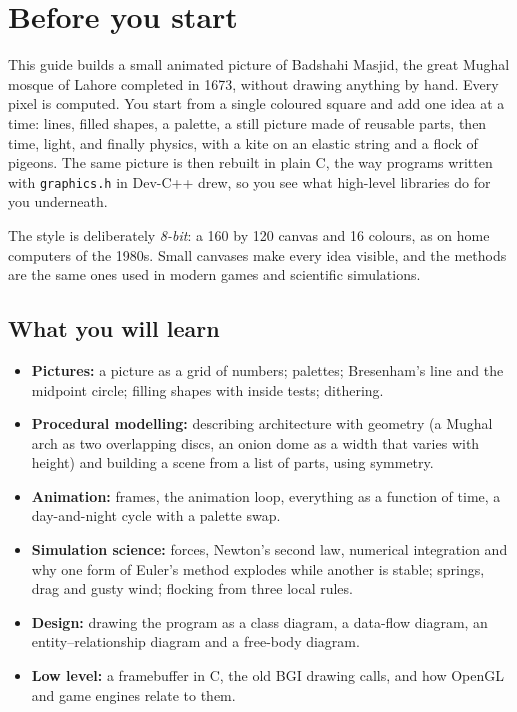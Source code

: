 \chapter{Before you start}\label{ch:start}

This guide builds a small animated picture of Badshahi Masjid, the great Mughal mosque of Lahore completed in 1673, without drawing anything by hand. Every pixel is computed. You start from a single coloured square and add one idea at a time: lines, filled shapes, a palette, a still picture made of reusable parts, then time, light, and finally physics, with a kite on an elastic string and a flock of pigeons. The same picture is then rebuilt in plain C, the way programs written with \texttt{graphics.h} in Dev-C++ drew, so you see what high-level libraries do for you underneath.

The style is deliberately \emph{8-bit}: a 160 by 120 canvas and 16 colours, as on home computers of the 1980s. Small canvases make every idea visible, and the methods are the same ones used in modern games and scientific simulations.

\section{What you will learn}
\begin{itemize}
\item \textbf{Pictures:} a picture as a grid of numbers; palettes; Bresenham's line and the midpoint circle; filling shapes with inside tests; dithering.
\item \textbf{Procedural modelling:} describing architecture with geometry (a Mughal arch as two overlapping discs, an onion dome as a width that varies with height) and building a scene from a list of parts, using symmetry.
\item \textbf{Animation:} frames, the animation loop, everything as a function of time, a day-and-night cycle with a palette swap.
\item \textbf{Simulation science:} forces, Newton's second law, numerical integration and why one form of Euler's method explodes while another is stable; springs, drag and gusty wind; flocking from three local rules.
\item \textbf{Design:} drawing the program as a class diagram, a data-flow diagram, an entity--relationship diagram and a free-body diagram.
\item \textbf{Low level:} a framebuffer in C, the old BGI drawing calls, and how OpenGL and game engines relate to them.
\end{itemize}

